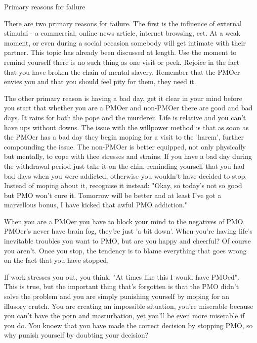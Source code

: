Primary reasons for failure

There are two primary reasons for failure. The first is the influence of external stimulai - a commercial, online news article, internet browsing, ect. At a weak moment, or even during a social occasion somebody will get intimate with their partner. This topic has already been discussed at length. Use the moment to remind yourself there is no such thing as one visit or peek. Rejoice in the fact that you have broken the chain of mental slavery. Remember that the PMOer envies you and that you should feel pity for them, they need it.

The other primary reason is having a bad day, get it clear in your mind before you start that whether you are a PMOer and non-PMOer there are good and bad days. It rains for both the pope and the murderer. Life is relative and you can't have ups without downs. The issue with the willpower method is that as soon as the PMOer has a bad day they begin moping for a visit to the 'harem', further compounding the issue. The non-PMOer is better equipped, not only physically but mentally, to cope with thee stresses and strains. If you have a bad day during the withdrawal period just take it on the chin, reminding yourself that you had bad days when you were addicted, otherwise you wouldn't have decided to stop. Instead of moping about it, recognise it instead: "Okay, so today's not so good but PMO won't cure it. Tomorrow will be better and at least I've got a marvellous bonus, I have kicked that awful PMO addiction."

When you are a PMOer you have to block your mind to the negatives of PMO. PMOer's never have brain fog, they're just 'a bit down'. When you're having life's inevitable troubles you want to PMO, but are you happy and cheerful? Of course you aren't. Once you stop, the tendency is to blame everything that goes wrong on the fact that you have stopped.

If work stresses you out, you think, "At times like this I would have PMOed". This is true, but the important thing that's forgotten is that the PMO didn't solve the problem and you are simply punishing yourself by moping for an illusory crutch. You are creating an impossible situation, you're miserable because you can't have the porn and masturbation, yet you'll be even more miserable if you do. You knoew that you have made the correct decision by stopping PMO, so why punish yourself by doubting your decision?

